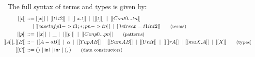 The full syntax of terms and types is given by:
\begin{align*}
   \hspace{-0.9em}
   [[ t ]] ::= & \;
   [[ x ]]
   \mid \hspace{0.2em}[[ t1 t2 ]]
   \hspace{0.2em}\mid \hspace{0.2em}[[ \ x . t ]] 
   \hspace{0.2em}\mid \hspace{0.2em}[[ [ t ] ]] 
   \hspace{0.2em}\mid \hspace{0.2em}[[ Con t0 ... tn ]] \\
   \hspace{0.2em}\mid & \hspace{0.2em}[[ case t of p1 -> t1 ; * ; pn -> tn  ]] 
   \hspace{0.2em}\mid \hspace{0.2em}[[ letrec x = t1 in t2]]
 {\small{\tag{terms}}}
 \\
   \hspace{-0.9em}
   [[ p ]] ::= & \;
   \hspace{0.2em} [[ x ]]
   \hspace{0.2em} \mid \hspace{0.2em} \_
   \hspace{0.2em }\mid \hspace{0.2em} [[ [ p ] ]]
   \hspace{0.2em} \mid \hspace{0.2em} [[ Con p0 ... pn ]]
{\small{\tag{patterns}}}
\\
   \hspace{-0.9em}
   [[ A ]], [[ B ]] ::= & \;
   \hspace{0.2em}[[ A -o B ]]
   \hspace{0.2em}\mid \hspace{0.2em} \alpha
   \hspace{0.2em}\mid \hspace{0.2em} [[ Tup A B ]]
   \hspace{0.2em}\mid \hspace{0.2em} [[ Sum A B ]]
   \hspace{0.2em}\mid \hspace{0.2em} [[ Unit ]]
   \hspace{0.2em} \mid \hspace{0.2em} [[ [] r A ]]
   \hspace{0.2em}\mid \hspace{0.2em} [[ mu X . A ]]
   \hspace{0.2em}\mid \hspace{0.2em} [[ X ]]
 {\small{\tag{types}}} \\
 \hspace{-0.9em}
   [[ C ]] ::= & \; () \mid \mathsf{inl} \mid \mathsf{inr}
                 \mid (,)
 {\small{\tag{data constructors}}}
 \end{align*}
